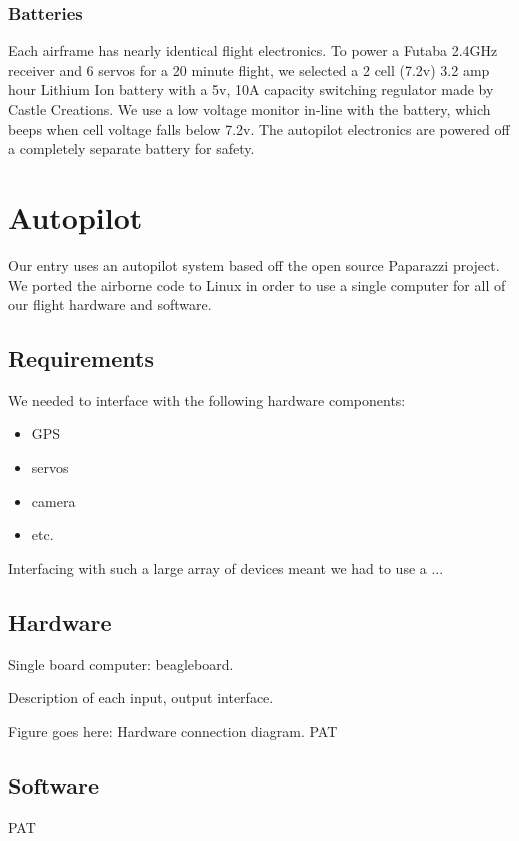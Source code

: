 \documentclass[10pt]{report}
\begin{document}
\subsubsection{Batteries}

Each airframe has nearly identical flight electronics. To power a Futaba 2.4GHz receiver and 6 servos for a 20 minute flight, we selected a 2 cell (7.2v) 3.2 amp hour Lithium Ion battery with a 5v, 10A capacity switching regulator made by Castle Creations. We use a low voltage monitor in-line with the battery, which beeps when cell voltage falls below 7.2v. The autopilot electronics are powered off a completely separate battery for safety.

\section{Autopilot}
Our entry uses an autopilot system based off the open source 
Paparazzi project\cite{paparazziweb}. 
We ported the airborne code to Linux in order to use a single computer for all of our flight hardware and software.

\subsection{Requirements}

We needed to interface with the following hardware components:
\begin{itemize}
	\setlength{\itemsep}{0cm}
	\setlength{\parskip}{0cm}
	\item GPS
	\item servos
	\item camera
	\item etc.
\end{itemize}

Interfacing with such a large array of devices meant we had to use a ...

\subsection{Hardware}
Single board computer: beagleboard.

Description of each input, output interface.

Figure goes here: Hardware connection diagram. PAT
\subsection{Software}
\label{sec:autopilot_software}
PAT
\end{document}
